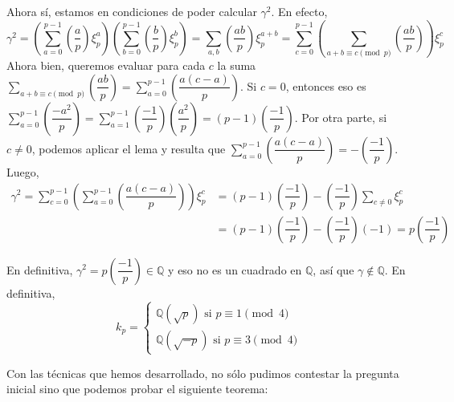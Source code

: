 \documentclass[12pt]{book}
\theoremstyle{definition}
\newcommand{\QQ}{\mathbb{Q}}
\begin{document}
Ahora sí, estamos en condiciones de poder calcular $\gamma^2$. En efecto, $$\gamma^2 = \left(\displaystyle\sum_{a=0}^{p-1}\left(\dfrac{a}{p}\right)\xi_p^a\right)\left(\displaystyle\sum_{b=0}^{p-1} \left(\dfrac{b}{p}\right) \xi_p^b\right) = \displaystyle\sum_{a,b}\left(\dfrac{ab}{p}\right) \xi_p^{a+b} = \displaystyle\sum_{c=0}^{p-1} \left(\displaystyle\sum_{a+b\equiv c\pmod{p}}\left(\dfrac{ab}{p}\right)\right) \xi_p^c$$
Ahora bien, queremos evaluar para cada $c$ la suma $\displaystyle\sum_{a+b\equiv c\pmod{p}}\left(\dfrac{ab}{p}\right) = \displaystyle\sum_{a=0}^{p-1} \left(\dfrac{a(c-a)}{p}\right)$. Si $c=0$, entonces eso es $\displaystyle\sum_{a=0}^{p-1} \left(\dfrac{-a^2}{p}\right) = \sum_{a=1}^{p-1} \left(\dfrac{-1}{p}\right) \left(\dfrac{a^2}{p}\right) = (p-1)\left(\dfrac{-1}{p}\right)$. Por otra parte, si $c\neq 0$, podemos aplicar el lema y resulta que $\displaystyle\sum_{a=0}^{p-1} \left(\dfrac{a(c-a)}{p}\right) = -\left(\dfrac{-1}{p}\right)$. Luego, \begin{align*} \gamma^2 = \displaystyle\sum_{c=0}^{p-1} \left(\sum_{a=0}^{p-1}\left(\dfrac{a(c-a)}{p}\right)\right)\xi_p^c &= (p-1)\left(\dfrac{-1}{p}\right) -  \left(\dfrac{-1}{p}\right)\displaystyle\sum_{c\neq 0}\xi_p^c\\ &= (p-1)\left(\dfrac{-1}{p}\right) -  \left(\dfrac{-1}{p}\right)(-1) = p\left(\dfrac{-1}{p}\right)\end{align*}

En definitiva, $\gamma^2 = p\left(\dfrac{-1}{p}\right)\in\QQ$ y eso no es un cuadrado en $\QQ$, así que $\gamma\notin\QQ$. En definitiva, $$k_p = \begin{cases} \QQ(\sqrt{p}) \text{ si }p\equiv 1\pmod{4} \\ \QQ(\sqrt{-p}) \text{ si }p\equiv 3 \pmod{4}\end{cases}$$

Con las técnicas que hemos desarrollado, no sólo pudimos contestar la pregunta inicial sino que podemos probar el siguiente teorema:
\end{document}
